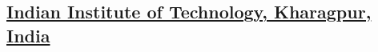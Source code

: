 \documentclass[10pt, a4paper, sans]{moderncv}
\begin{document}
\subsection{\href{http://www.iitkgp.ac.in/}{Indian Institute of Technology, Kharagpur, India}}
%
%
\end{document}
